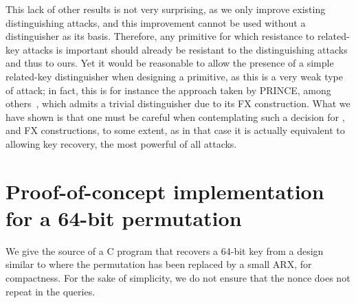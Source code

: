 This lack of other results is not very surprising, as we only improve existing distinguishing
attacks, and this improvement cannot be used without a distinguisher as its basis.
Therefore, any primitive for which resistance to related-key attacks is important should already be resistant
to the distinguishing attacks and thus to ours. Yet it would be reasonable to allow the presence
of a simple related-key distinguisher when designing a primitive, as this is a very weak type of
attack; in fact, this is for instance the approach taken by PRINCE, among others~\cite{PRINCE}, which admits
a trivial distinguisher due to its \textsf{FX} construction.
What we have shown is that one must be
careful when contemplating such a decision for \EM, and \textsf{FX} constructions, to some extent, as in that case it is actually
equivalent to allowing key recovery, the most powerful of all attacks.

\setcounter{section}{0}
\renewcommand\thesection{\Alph{section}}

\section{Proof-of-concept implementation for a 64-bit permutation}
\label{sec:toy}

We give the source of a C program that recovers a 64-bit key from a design similar to \proestotr where
the permutation has been replaced by a small ARX, for compactness. For the sake of simplicity,
we do not ensure that the nonce does not repeat in the queries.

